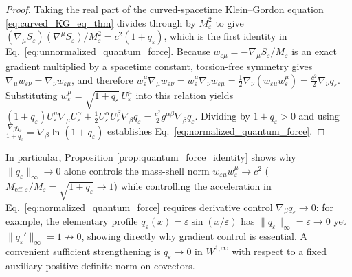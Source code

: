 \documentclass[11pt, a4paper]{article}
\theoremstyle{definition}
\begin{document}
\begin{proof}
Taking the real part of the curved-spacetime Klein--Gordon equation \eqref{eq:curved_KG_eq_thm} divides through by $M_\varepsilon^2$ to give $(\nabla_\mu S_\varepsilon)(\nabla^\mu S_\varepsilon)/M_\varepsilon^2 = c^2(1 + q_\varepsilon)$, which is the first identity in Eq.~\eqref{eq:unnormalized_quantum_force}. Because $w_{\varepsilon\mu} = -\nabla_\mu S_\varepsilon / M_\varepsilon$ is an exact gradient multiplied by a spacetime constant, torsion-free symmetry gives $\nabla_\mu w_{\varepsilon\nu} = \nabla_\nu w_{\varepsilon\mu}$, and therefore $w_\varepsilon^\mu \nabla_\mu w_{\varepsilon\nu} = w_\varepsilon^\mu \nabla_\nu w_{\varepsilon\mu} = \frac{1}{2}\nabla_\nu(w_{\varepsilon\mu}w_\varepsilon^\mu) = \frac{c^2}{2}\nabla_\nu q_\varepsilon$. Substituting $w_\varepsilon^\mu = \sqrt{1 + q_\varepsilon}\,U_\varepsilon^\mu$ into this relation yields $(1 + q_\varepsilon)U_\varepsilon^\mu \nabla_\mu U_\varepsilon^\alpha + \frac{1}{2}U_\varepsilon^\alpha U_\varepsilon^\beta \nabla_\beta q_\varepsilon = \frac{c^2}{2}g^{\alpha\beta}\nabla_\beta q_\varepsilon$. Dividing by $1 + q_\varepsilon > 0$ and using $\frac{\nabla_\beta q_\varepsilon}{1 + q_\varepsilon} = \nabla_\beta \ln(1 + q_\varepsilon)$ establishes Eq.~\eqref{eq:normalized_quantum_force}.
\end{proof}

In particular, Proposition \ref{prop:quantum_force_identity} shows why $\|q_\varepsilon\|_\infty \to 0$ alone controls the mass-shell norm $w_{\varepsilon\mu}w_\varepsilon^\mu \to c^2$ ($M_{\text{eff},\varepsilon}/M_\varepsilon = \sqrt{1 + q_\varepsilon} \to 1$) while controlling the acceleration in Eq.~\eqref{eq:normalized_quantum_force} requires derivative control $\nabla_\beta q_\varepsilon \to 0$: for example, the elementary profile $q_\varepsilon(x) = \varepsilon\sin(x/\varepsilon)$ has $\|q_\varepsilon\|_\infty = \varepsilon \to 0$ yet $\|q_\varepsilon'\|_\infty = 1 \not\to 0$, showing directly why gradient control is essential. A convenient sufficient strengthening is $q_\varepsilon \to 0$ in $W^{1,\infty}$ with respect to a fixed auxiliary positive-definite norm on covectors.
\end{document}
